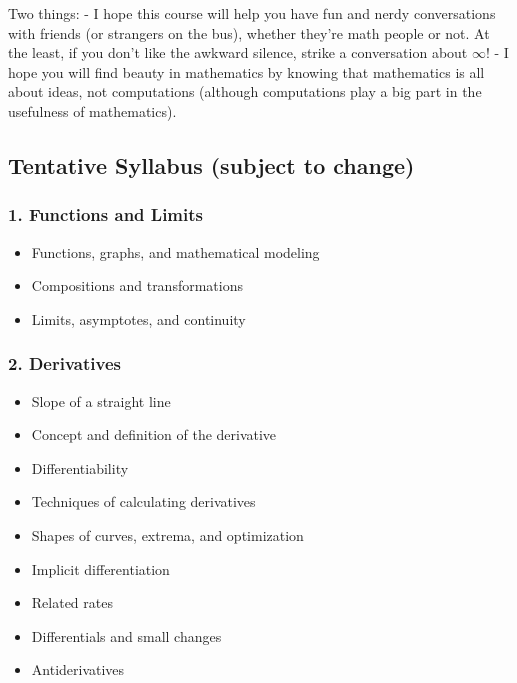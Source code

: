 \documentclass[
]{article}
\begin{document}
Two things:
- I hope this course will help you have fun and nerdy conversations with friends (or strangers on the bus), whether they're math people or not.
At the least, if you don't like the awkward silence, strike a conversation about \(\infty\)!
- I hope you will find beauty in mathematics by knowing that mathematics is all about ideas,
not computations (although computations play a big part in the usefulness of mathematics).

\subsection*{Tentative Syllabus (subject to change)}\label{tentative-syllabus-subject-to-change}

\subsubsection*{1. Functions and Limits}\label{functions-and-limits}

\begin{itemize}
\item
  Functions, graphs, and mathematical modeling
\item
  Compositions and transformations
\item
  Limits, asymptotes, and continuity
\end{itemize}

\subsubsection*{2. Derivatives}\label{derivatives}

\begin{itemize}
\item
  Slope of a straight line
\item
  Concept and definition of the derivative
\item
  Differentiability
\item
  Techniques of calculating derivatives
\item
  Shapes of curves, extrema, and optimization
\item
  Implicit differentiation
\item
  Related rates
\item
  Differentials and small changes
\item
  Antiderivatives
\end{itemize}
\end{document}
